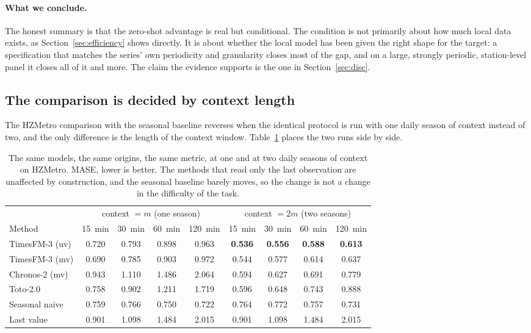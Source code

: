 \documentclass[utf8]{FrontiersinHarvard}
\newif\ifrevisionmarkup
\newcommand{\new}[1]{\ifrevisionmarkup\textcolor{revision}{#1}\else#1\fi}
\newif\ifsecondrevisionmarkup
\newcommand{\rev}[1]{\ifsecondrevisionmarkup\textcolor{revisiontwo}{#1}\else#1\fi}
\theoremstyle{plain}
\theoremstyle{definition}
\theoremstyle{remark}
\newcommand{\best}[1]{\textbf{#1}}
\begin{document}
\new{\paragraph{\rev{What we conclude.}} The honest summary is that the zero-shot advantage is real but conditional\rev{. The condition is} not primarily about how much local data exists, as Section~\ref{sec:efficiency} shows directly. It is about whether the local model has been given the right shape for the target: a specification that matches the series' own periodicity and granularity closes most of the gap, and on a large, strongly periodic, station-level panel it closes all of it and more. \rev{The claim the evidence supports is the one in Section~\ref{sec:disc}.}}

\subsection{The comparison is decided by context length}
\label{sec:context}

\rev{The HZMetro comparison with the seasonal baseline reverses when the identical protocol is run with one daily season of context instead of two,} and the only difference is the length of the context window. Table~\ref{tab:context} places the two runs side by side.

\begin{table}[htbp]
\centering
\caption{The same models, the same origins, the same metric, at one and at two daily seasons of context on HZMetro. MASE, lower is better. The methods that read only the last observation are unaffected by construction, and the seasonal baseline barely moves, so the change is not a change in the difficulty of the task.}
\label{tab:context}
\small
\begin{tabular}{lcccc@{\hskip 2em}cccc}
\toprule
& \multicolumn{4}{c}{context $=m$ (one season)} & \multicolumn{4}{c}{context $=2m$ (two seasons)} \\
\cmidrule(lr){2-5}\cmidrule(lr){6-9}
Method & \SI{15}{\minute} & \SI{30}{\minute} & \SI{60}{\minute} & \SI{120}{\minute} & \SI{15}{\minute} & \SI{30}{\minute} & \SI{60}{\minute} & \SI{120}{\minute} \\
\midrule
TimesFM-3 (uv)     & 0.720 & 0.793 & 0.898 & 0.963 & \best{0.536} & \best{0.556} & \best{0.588} & \best{0.613} \\
TimesFM-3 (mv)     & 0.690 & 0.785 & 0.903 & 0.972 & 0.544 & 0.577 & 0.614 & 0.637 \\
Chronos-2 (mv)     & 0.943 & 1.110 & 1.486 & 2.064 & 0.594 & 0.627 & 0.691 & 0.779 \\
Toto-2.0           & 0.758 & 0.902 & 1.211 & 1.719 & 0.596 & 0.648 & 0.743 & 0.888 \\
\midrule
Seasonal naive     & 0.759 & 0.766 & 0.750 & 0.722 & 0.764 & 0.772 & 0.757 & 0.731 \\
Last value         & 0.901 & 1.098 & 1.484 & 2.015 & 0.901 & 1.098 & 1.484 & 2.015 \\
\bottomrule
\end{tabular}
\end{table}
\end{document}
